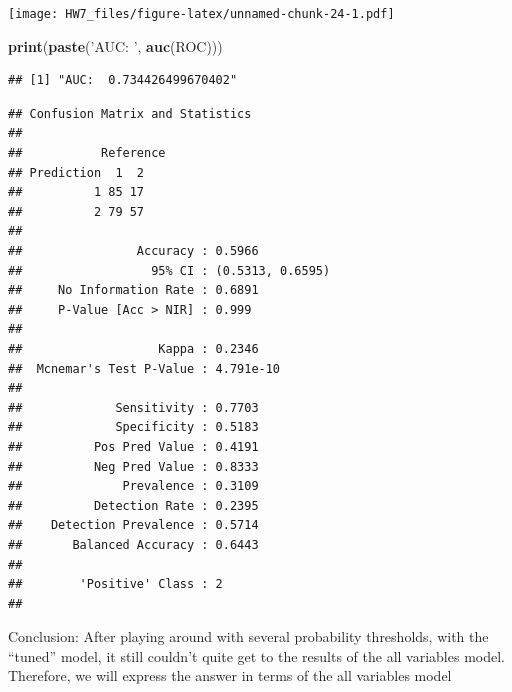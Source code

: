 \documentclass[]{article}
\newenvironment{Shaded}{\begin{snugshade}}{\end{snugshade}}
\newcommand{\KeywordTok}[1]{\textcolor[rgb]{0.13,0.29,0.53}{\textbf{#1}}}
\newcommand{\DataTypeTok}[1]{\textcolor[rgb]{0.13,0.29,0.53}{#1}}
\newcommand{\DecValTok}[1]{\textcolor[rgb]{0.00,0.00,0.81}{#1}}
\newcommand{\FloatTok}[1]{\textcolor[rgb]{0.00,0.00,0.81}{#1}}
\newcommand{\StringTok}[1]{\textcolor[rgb]{0.31,0.60,0.02}{#1}}
\newcommand{\OperatorTok}[1]{\textcolor[rgb]{0.81,0.36,0.00}{\textbf{#1}}}
\newcommand{\NormalTok}[1]{#1}
\begin{document}
\texttt{[image: HW7\_files/figure-latex/unnamed-chunk-24-1.pdf]}

\begin{Shaded}
\begin{Highlighting}[]
\KeywordTok{print}\NormalTok{(}\KeywordTok{paste}\NormalTok{(}\StringTok{'AUC: '}\NormalTok{, }\KeywordTok{auc}\NormalTok{(ROC)))}
\end{Highlighting}
\end{Shaded}

\begin{verbatim}
## [1] "AUC:  0.734426499670402"
\end{verbatim}

\begin{Shaded}
\end{Shaded}

\begin{verbatim}
## Confusion Matrix and Statistics
## 
##           Reference
## Prediction  1  2
##          1 85 17
##          2 79 57
##                                           
##                Accuracy : 0.5966          
##                  95% CI : (0.5313, 0.6595)
##     No Information Rate : 0.6891          
##     P-Value [Acc > NIR] : 0.999           
##                                           
##                   Kappa : 0.2346          
##  Mcnemar's Test P-Value : 4.791e-10       
##                                           
##             Sensitivity : 0.7703          
##             Specificity : 0.5183          
##          Pos Pred Value : 0.4191          
##          Neg Pred Value : 0.8333          
##              Prevalence : 0.3109          
##          Detection Rate : 0.2395          
##    Detection Prevalence : 0.5714          
##       Balanced Accuracy : 0.6443          
##                                           
##        'Positive' Class : 2               
## 
\end{verbatim}

Conclusion: After playing around with several probability thresholds,
with the ``tuned'' model, it still couldn't quite get to the results of
the all variables model. Therefore, we will express the answer in terms
of the all variables model
\end{document}
